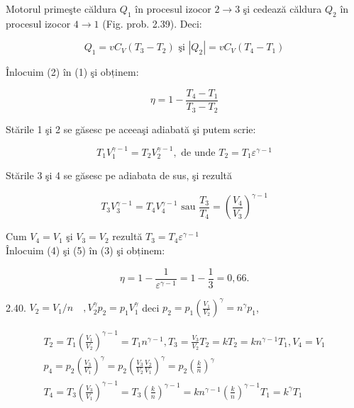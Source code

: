 \documentclass[10pt]{article}
\begin{document}
Motorul primeşte căldura $Q_{1}$ în procesul izocor $2 \rightarrow 3$ şi cedează căldura $Q_{2}$ în procesul izocor $4 \rightarrow 1$ (Fig. prob. 2.39). Deci:


\begin{equation*}
Q_{1}=v C_{V}\left(T_{3}-T_{2}\right) \text { şi }\left|Q_{2}\right|=v C_{V}\left(T_{4}-T_{1}\right) \tag{2}
\end{equation*}


Înlocuim (2) în (1) şi obținem:


\begin{equation*}
\eta=1-\frac{T_{4}-T_{1}}{T_{3}-T_{2}} \tag{3}
\end{equation*}


Stările 1 şi 2 se găsesc pe aceeaşi adiabată şi putem scrie:


\begin{equation*}
T_{1} V_{1}^{\gamma-1}=T_{2} V_{2}^{\gamma-1}, \text { de unde } T_{2}=T_{1} \varepsilon^{\gamma-1} \tag{4}
\end{equation*}


Stările 3 şi 4 se găsesc pe adiabata de sus, şi rezultă


\begin{equation*}
T_{3} V_{3}^{\gamma-1}=T_{4} V_{4}^{\gamma-1} \text { sau } \frac{T_{3}}{T_{4}}=\left(\frac{V_{4}}{V_{3}}\right)^{\gamma-1} \tag{5}
\end{equation*}


Cum $V_{4}=V_{1}$ şi $V_{3}=V_{2}$ rezultă $T_{3}=T_{4} \varepsilon^{\gamma-1}$\\
Înlocuim (4) şi (5) în (3) şi obținem:

$$
\eta=1-\frac{1}{\varepsilon^{\gamma-1}}=1-\frac{1}{3}=0,66 .
$$

2.40. $V_{2}=V_{1} / n \quad, V_{2}^{\gamma} p_{2}=p_{1} V_{1}^{\gamma}$ deci $p_{2}=p_{1}\left(\frac{V_{1}}{V_{2}}\right)^{\gamma}=n^{\gamma} p_{1}$,

$$
\begin{gathered}
T_{2}=T_{1}\left(\frac{V_{1}}{V_{2}}\right)^{\gamma-1}=T_{1} n^{\gamma-1}, T_{3}=\frac{V_{3}}{V_{2}} T_{2}=k T_{2}=k n^{\gamma-1} T_{1}, V_{4}=V_{1} \\
p_{4}=p_{2}\left(\frac{V_{3}}{V_{1}}\right)^{\gamma}=p_{2}\left(\frac{V_{3}}{V_{2}} \frac{V_{2}}{V_{1}}\right)^{\gamma}=p_{2}\left(\frac{k}{n}\right)^{\gamma} \\
T_{4}=T_{3}\left(\frac{V_{3}}{V_{1}}\right)^{\gamma-1}=T_{3}\left(\frac{k}{n}\right)^{\gamma-1}=k n^{\gamma-1}\left(\frac{k}{n}\right)^{\gamma-1} T_{1}=k^{\gamma} T_{1}
\end{gathered}
$$
\end{document}
